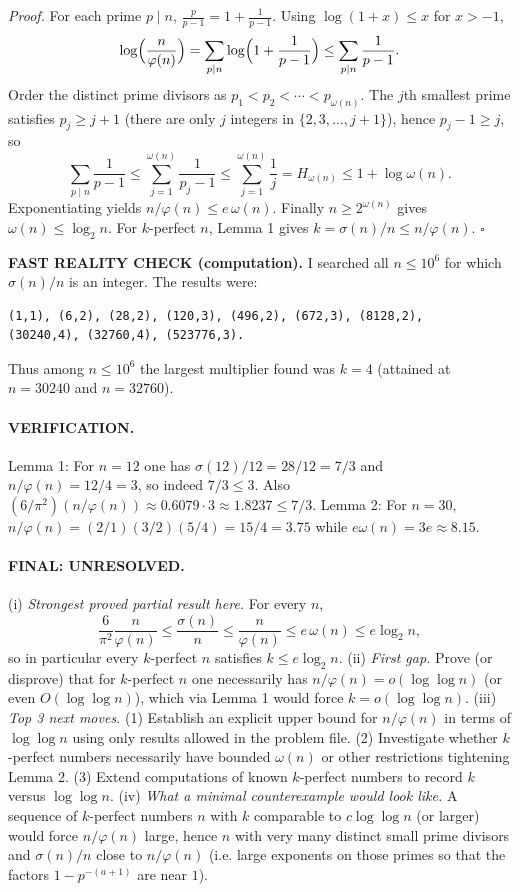 \emph{Proof.}
For each prime $p\mid n$, $\frac{p}{p-1}=1+\frac{1}{p-1}$.
Using $\log(1+x)\le x$ for $x>-1$,
\[
\log\Bigl(\frac{n}{\varphi(n)}\Bigr)=\sum_{p\mid n}\log\Bigl(1+\frac{1}{p-1}\Bigr)
\le \sum_{p\mid n}\frac{1}{p-1}.
\]
Order the distinct prime divisors as $p_1<p_2<\cdots<p_{\omega(n)}$.
The $j$th smallest prime satisfies $p_j\ge j+1$ (there are only $j$ integers in $\{2,3,\dots,j+1\}$), hence $p_j-1\ge j$, so
\[
\sum_{p\mid n}\frac{1}{p-1}\le \sum_{j=1}^{\omega(n)}\frac{1}{p_j-1}\le \sum_{j=1}^{\omega(n)}\frac{1}{j}
=H_{\omega(n)}\le 1+\log\omega(n).
\]
Exponentiating yields $n/\varphi(n)\le e\,\omega(n)$.
Finally $n\ge 2^{\omega(n)}$ gives $\omega(n)\le \log_2 n$.
For $k$-perfect $n$, Lemma 1 gives $k=\sigma(n)/n\le n/\varphi(n)$.
\hfill$\square$

\textbf{FAST REALITY CHECK (computation).}
I searched all $n\le 10^6$ for which $\sigma(n)/n$ is an integer. The results were:
\begin{verbatim}
(1,1), (6,2), (28,2), (120,3), (496,2), (672,3), (8128,2),
(30240,4), (32760,4), (523776,3).
\end{verbatim}
Thus among $n\le 10^6$ the largest multiplier found was $k=4$ (attained at $n=30240$ and $n=32760$).

\paragraph{VERIFICATION.}
Lemma 1: For $n=12$ one has $\sigma(12)/12 = 28/12 = 7/3$ and $n/\varphi(n)=12/4=3$, so indeed $7/3\le 3$.
Also $(6/\pi^2)(n/\varphi(n)) \approx 0.6079\cdot 3\approx 1.8237 \le 7/3$.
Lemma 2: For $n=30$, $n/\varphi(n)=(2/1)(3/2)(5/4)=15/4=3.75$ while $e\omega(n)=3e\approx 8.15$.

\paragraph{FINAL: UNRESOLVED.}
(i) \emph{Strongest proved partial result here.} For every $n$,
\[
\frac{6}{\pi^2}\frac{n}{\varphi(n)}\le \frac{\sigma(n)}{n}\le \frac{n}{\varphi(n)}\le e\,\omega(n)\le e\log_2 n,
\]
so in particular every $k$-perfect $n$ satisfies $k\le e\log_2 n$.
(ii) \emph{First gap.} Prove (or disprove) that for $k$-perfect $n$ one necessarily has $n/\varphi(n)=o(\log\log n)$ (or even $O(\log\log n)$), which via Lemma 1 would force $k=o(\log\log n)$.
(iii) \emph{Top 3 next moves.} (1) Establish an explicit upper bound for $n/\varphi(n)$ in terms of $\log\log n$ using only results allowed in the problem file. (2) Investigate whether $k$-perfect numbers necessarily have bounded $\omega(n)$ or other restrictions tightening Lemma 2. (3) Extend computations of known $k$-perfect numbers to record $k$ versus $\log\log n$.
(iv) \emph{What a minimal counterexample would look like.} A sequence of $k$-perfect numbers $n$ with $k$ comparable to $c\log\log n$ (or larger) would force $n/\varphi(n)$ large, hence $n$ with very many distinct small prime divisors and $\sigma(n)/n$ close to $n/\varphi(n)$ (i.e. large exponents on those primes so that the factors $1-p^{-(a+1)}$ are near $1$).



